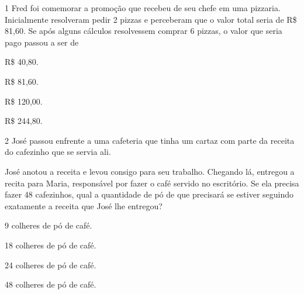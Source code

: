 {

\num{1} Fred foi comemorar a promoção que recebeu de seu chefe em uma
pizzaria. Inicialmente resolveram pedir 2 pizzas e perceberam que o
valor total seria de R\$ 81,60. Se após alguns cálculos resolvessem
comprar 6 pizzas, o valor que seria pago passou a ser de 


\begin{escolha}
\item
  R\$ 40,80.
\item
  R\$ 81,60.
\item
  R\$ 120,00.
\item
  R\$ 244,80.
\end{escolha}



\num{2} José passou enfrente a uma cafeteria que tinha um cartaz com parte
da receita do cafezinho que se servia ali.


José anotou a receita e levou consigo para seu trabalho. Chegando lá,
entregou a recita para Maria, responsável por fazer o café servido no
escritório. Se ela precisa fazer 48 cafezinhos, qual a
quantidade de pó de que precisará se estiver seguindo exatamente a receita que José lhe entregou?

\begin{escolha}
\item
  9 colheres de pó de café.
\item
  18 colheres de pó de café.
\item
  24 colheres de pó de café.
\item
  48 colheres de pó de café.
\end{escolha}

}
